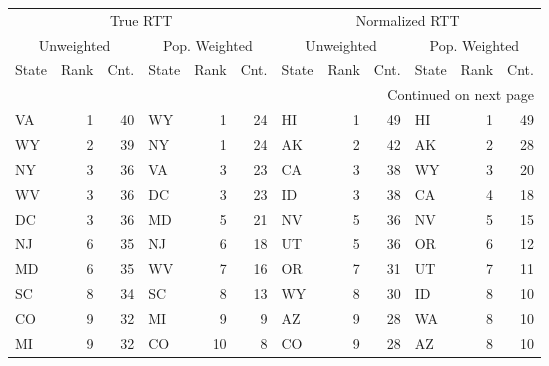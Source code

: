 \begin{longtable}{lrr|lrr||lrr|lrr}
\toprule
  \multicolumn{6}{c||}{True RTT} & \multicolumn{6}{c}{Normalized RTT} \\
\multicolumn{3}{c|}{Unweighted} & \multicolumn{3}{c||}{Pop. Weighted} & \multicolumn{3}{c|}{Unweighted} & \multicolumn{3}{c}{Pop. Weighted} \\
     State & Rank & Cnt. &         State & Rank & Cnt. &          State & Rank & Cnt. &         State & Rank & Cnt. \\
\midrule
\endhead
\midrule
\multicolumn{12}{r}{{Continued on next page}} \\
\midrule
\endfoot

\bottomrule
\endlastfoot
        VA &    1 &            40 &            WY &    1 &            24 &             HI &    1 &            49 &            HI &    1 &            49 \\
        WY &    2 &            39 &            NY &    1 &            24 &             AK &    2 &            42 &            AK &    2 &            28 \\
        NY &    3 &            36 &            VA &    3 &            23 &             CA &    3 &            38 &            WY &    3 &            20 \\
        WV &    3 &            36 &            DC &    3 &            23 &             ID &    3 &            38 &            CA &    4 &            18 \\
        DC &    3 &            36 &            MD &    5 &            21 &             NV &    5 &            36 &            NV &    5 &            15 \\
        NJ &    6 &            35 &            NJ &    6 &            18 &             UT &    5 &            36 &            OR &    6 &            12 \\
        MD &    6 &            35 &            WV &    7 &            16 &             OR &    7 &            31 &            UT &    7 &            11 \\
        SC &    8 &            34 &            SC &    8 &            13 &             WY &    8 &            30 &            ID &    8 &            10 \\
        CO &    9 &            32 &            MI &    9 &             9 &             AZ &    9 &            28 &            WA &    8 &            10 \\
        MI &    9 &            32 &            CO &   10 &             8 &             CO &    9 &            28 &            AZ &    8 &            10 \\

\end{longtable}

